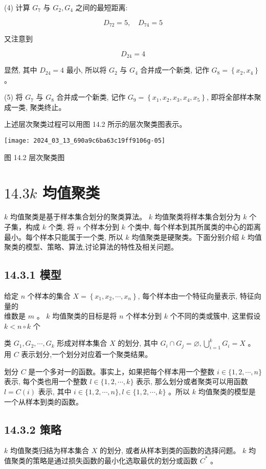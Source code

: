 \documentclass[10pt]{article}
\begin{document}
(4) 计算 $G_{7}$ 与 $G_{2}, G_{4}$ 之间的最短距离:

$$
D_{72}=5, \quad D_{74}=5
$$

又注意到

$$
D_{24}=4
$$

显然, 其中 $D_{24}=4$ 最小, 所以将 $G_{2}$ 与 $G_{4}$ 合并成一个新类, 记作 $G_{8}=\left\{x_{2}, x_{4}\right\}$ 。

(5) 将 $G_{7}$ 与 $G_{8}$ 合并成一个新类, 记作 $G_{9}=\left\{x_{1}, x_{2}, x_{3}, x_{4}, x_{5}\right\}$, 即将全部样本聚成一类, 聚类终止。

上述层次聚类过程可以用图 14.2 所示的层次聚类图表示。

\begin{center}
\texttt{[image: 2024\_03\_13\_690a9c6ba63c19ff9106g-05]}
\end{center}

图 14.2 层次聚类图

\section*{$14.3 k$ 均值聚类}
$k$ 均值聚类是基于样本集合划分的聚类算法。 $k$ 均值聚类将样本集合划分为 $k$ 个子集，构成 $k$ 个类, 将 $n$ 个样本分到 $k$ 个类中, 每个样本到其所属类的中心的距离最小。每个样本只能属于一个类, 所以 $k$ 均值聚类是硬聚类。下面分别介绍 $k$ 均值聚类的模型、策略、算法,讨论算法的特性及相关问题。

\subsection*{14.3.1 模型}
给定 $n$ 个样本的集合 $X=\left\{x_{1}, x_{2}, \cdots, x_{n}\right\}$, 每个样本由一个特征向量表示, 特征向量的\\
维数是 $m$ 。 $k$ 均值聚类的目标是将 $n$ 个样本分到 $k$ 个不同的类或簇中, 这里假设 $k<n \circ k$ 个

类 $G_{1}, G_{2}, \cdots, G_{k}$ 形成对样本集合 $X$ 的划分, 其中 $G_{i} \cap G_{j}=\varnothing, \bigcup_{i=1}^{k} G_{i}=X$ 。用 $C$ 表示划分,一个划分对应着一个聚类结果。

划分 $C$ 是一个多对一的函数。事实上，如果把每个样本用一个整数 $i \in\{1,2, \cdots, n\}$ 表示, 每个类也用一个整数 $l \in\{1,2, \cdots, k\}$ 表示, 那么划分或者聚类可以用函数 $l=C(i)$ 表示, 其中 $i \in\{1,2, \cdots, n\}, l \in\{1,2, \cdots, k\}$ 。所以 $k$ 均值聚类的模型是一个从样本到类的函数。

\subsection*{14.3.2 策略}
$k$ 均值聚类归结为样本集合 $X$ 的划分, 或者从样本到类的函数的选择问题。 $k$ 均值聚类的策略是通过损失函数的最小化选取最优的划分或函数 $C^{*}$ 。
\end{document}
